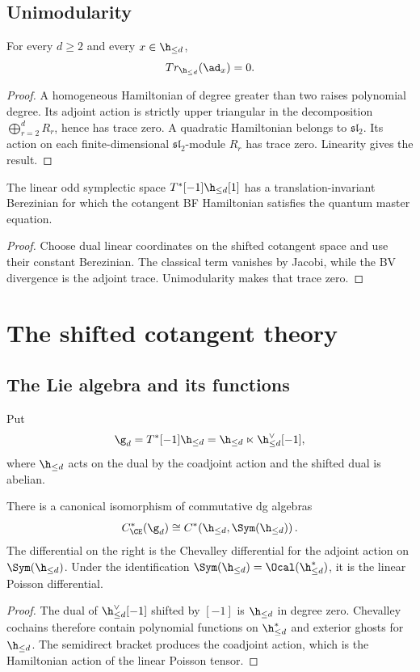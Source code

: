 \section{Unimodularity}
\begin{theorem}
For every $d\ge2$ and every $x\in\h_{\le d}$,
\[
 \Tr_{\h_{\le d}}(\ad_x)=0.
\]
\end{theorem}
\begin{proof}
A homogeneous Hamiltonian of degree greater than two raises polynomial degree.  Its adjoint action is strictly upper triangular in the decomposition $\bigoplus_{r=2}^{d}R_r$, hence has trace zero.  A quadratic Hamiltonian belongs to $\mathfrak{sl}_2$.  Its action on each finite-dimensional $\mathfrak{sl}_2$-module $R_r$ has trace zero.  Linearity gives the result.
\end{proof}

\begin{corollary}
The linear odd symplectic space $T^*[-1]\h_{\le d}[1]$ has a translation-invariant Berezinian for which the cotangent BF Hamiltonian satisfies the quantum master equation.
\end{corollary}
\begin{proof}
Choose dual linear coordinates on the shifted cotangent space and use their constant Berezinian.  The classical term vanishes by Jacobi, while the BV divergence is the adjoint trace.  Unimodularity makes that trace zero.
\end{proof}

\chapter{The shifted cotangent theory}
\section{The Lie algebra and its functions}
Put
\[
 \g_d=T^*[-1]\h_{\le d}
 =\h_{\le d}\ltimes\h_{\le d}^\vee[-1],
\]
where $\h_{\le d}$ acts on the dual by the coadjoint action and the shifted dual is abelian.

\begin{proposition}
There is a canonical isomorphism of commutative dg algebras
\[
 C^*_{\CE}(\g_d)
 \cong
 C^*\!\left(\h_{\le d},\Sym(\h_{\le d})\right).
\]
The differential on the right is the Chevalley differential for the adjoint action on $\Sym(\h_{\le d})$.  Under the identification $\Sym(\h_{\le d})=\Ocal(\h_{\le d}^*)$, it is the linear Poisson differential.
\end{proposition}
\begin{proof}
The dual of $\h_{\le d}^\vee[-1]$ shifted by $[-1]$ is $\h_{\le d}$ in degree zero.  Chevalley cochains therefore contain polynomial functions on $\h_{\le d}^*$ and exterior ghosts for $\h_{\le d}$.  The semidirect bracket produces the coadjoint action, which is the Hamiltonian action of the linear Poisson tensor.
\end{proof}

